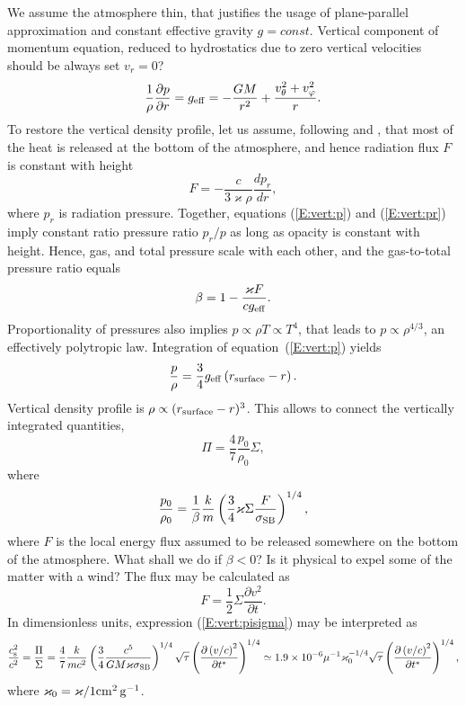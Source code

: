 \documentclass[usenatbib,onecolumn]{mnras}
\newcommand{\alert}[1]{\color{red} #1\color{black}}
\newcommand{\pardir}[2]{\ensuremath{\frac{\partial #2}{\partial #1} }}
\newcommand{\cs}{\ensuremath{c_{\rm s}}}
\begin{document}
We assume the atmosphere thin, that justifies the usage of plane-parallel
approximation and constant effective gravity $g=const$. Vertical component of
momentum equation, reduced to hydrostatics due to zero vertical velocities
\alert{should be always set $v_r=0$?}
\begin{equation}\label{E:vert:p}
\frac{1}{\rho}\pardir{r}{p}
=g_{\rm eff} = -\frac{GM}{r^2} + \frac{v_\theta^2+v_\varphi^2}{r}.
\end{equation}
To restore the vertical density profile, let us assume, following \citet{IS99}
and \citet{VP06}, that most of the heat is released at the bottom of the
atmosphere, and hence radiation flux $F$ is constant with height
\begin{equation}\label{E:vert:pr}
F = - \frac{c}{3\varkappa \rho} \frac{dp_r}{dr},
\end{equation}
where $p_r$ is radiation pressure.
Together, equations (\ref{E:vert:p}) and (\ref{E:vert:pr}) imply constant
ratio pressure ratio $p_r / p$ as long as opacity is constant with height. 
Hence, gas, and total pressure scale with each other, and the gas-to-total
pressure ratio equals
\begin{equation}\label{E:vert:beta}
\beta = 1- \frac{\varkappa F }{cg_{\rm eff}}.
\end{equation}
Proportionality of pressures also implies $p \propto \rho T \propto T^4$, that
leads to $p\propto \rho^{4/3}$, an effectively polytropic law. Integration of
equation~(\ref{E:vert:p}) yields
\begin{equation}\label{E:vert:prho}
\frac{p}{\rho} = \frac{3}{4} g_{\rm eff} \left( r_{\rm surface} - r \right).
\end{equation}
Vertical density profile is $\rho \propto (r_{\rm surface} - r)^{3}$. This
allows to connect the vertically integrated quantities,
\begin{equation}\label{E:vert:pisigma}
\Pi = \frac{4}{7} \frac{p_0}{\rho_0} \Sigma,
\end{equation}
where
\begin{equation}\label{E:vert:p0rho0}
\frac{p_0}{\rho_0} = \frac{1}{\beta} \frac{k}{m} \left(\frac{3}{4}\varkappa
\Sigma \frac{F}{\sigma_{\rm SB}} \right)^{1/4},
\end{equation}
where $F$ is the local energy flux assumed to be released somewhere on the
bottom of the atmosphere. \alert{What shall we do if $\beta < 0$? Is it
  physical to expel some of the matter with a wind?} The flux may be
calculated as
\begin{equation}\label{E:vert:flux}
F = \frac{1}{2}\Sigma \pardir{t}{v^2} .
\end{equation}
In dimensionless units, expression (\ref{E:vert:pisigma}) may be interpreted
as
\begin{equation}\label{E:vert:flux}
\frac{\cs^2}{c^2} = \frac{\Pi}{\Sigma} = \frac{4}{7}\frac{k}{mc^2} \left( \frac{3}{4}
\frac{c^5}{GM\varkappa \sigma_{\rm SB}} \right)^{1/4} \sqrt{\tau} \left(
\pardir{t^*}{\left(v/c\right)^2}\right)^{1/4} \simeq 1.9\times 10^{-6}
\mu^{-1} \varkappa_0^{-1/4} \sqrt{\tau} \left(
\pardir{t^*}{\left(v/c\right)^2}\right)^{1/4},
\end{equation}
where $\varkappa_0 = \varkappa / 1{\rm cm^2\, g^{-1}}$.
\end{document}
